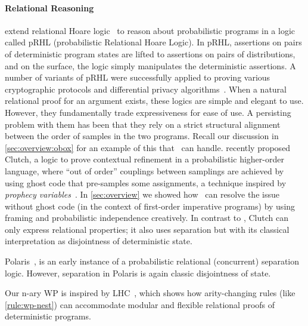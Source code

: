 \paragraph{\bfseries Relational Reasoning}
\citet{barthe2009formal} extend relational Hoare logic~\cite{benton2004simple} to reason about probabilistic programs in a logic called pRHL (probabilistic Relational Hoare Logic).
In pRHL, assertions on pairs of deterministic program states are lifted to assertions on pairs of distributions, and on the surface, the logic simply manipulates the deterministic assertions.
A number of variants of pRHL were successfully applied to proving various cryptographic protocols and differential privacy algorithms~\cite{barthe2009formal,barthe2015coupling,hsu2017probabilistic,wang2019proving, zhang2017lightdp}.
When a natural relational proof for an argument exists, these logics are simple and elegant to use. However, they fundamentally
trade expressiveness for ease of use.
A persisting problem with them has been that they rely on a strict structural alignment between the order of samples in the two programs. Recall our discussion in \cref{sec:overview:obox} for an example of this that \thelogic\ can handle.
\citet{gregersen2023asynchronous} recently proposed Clutch,
a logic to prove contextual refinement in a probabilistic higher-order language,
where ``out of order'' couplings between samplings are achieved by
using ghost code that pre-samples some assignments,
a technique inspired by \emph{prophecy variables}~\cite{jung2019future}.
In \cref{sec:overview} we showed how \thelogic\ can resolve the issue
without ghost code
(in the context of first-order imperative programs) by using framing and probabilistic independence creatively.
In contrast to \thelogic, Clutch can only express relational properties;
it also uses separation but with its classical interpretation as disjointness
of deterministic state.

Polaris~\cite{tassarotti2019polaris}, is an early instance of a probabilistic relational (concurrent) separation logic.
However, separation in Polaris is again classic disjointness of state.


Our \pre n-ary WP is inspired by LHC~\cite{d2022proving},
which shows how arity-changing rules (like \ref{rule:wp-nest})
can accommodate modular and flexible relational proofs of deterministic programs.



